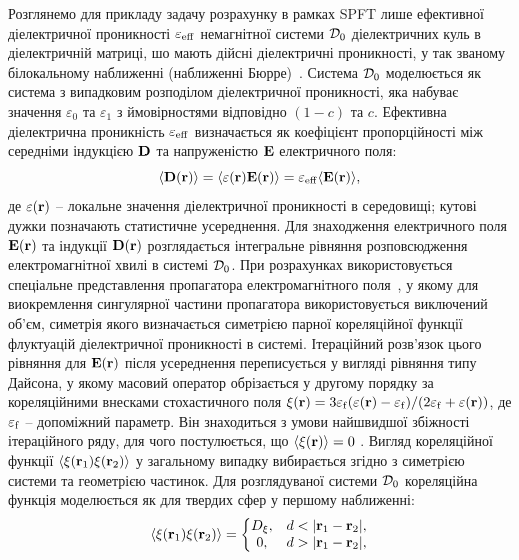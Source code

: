 \documentclass[14pt,twoside]{vakthesis}
\begin{document}
Розглянемо для прикладу задачу розрахунку в рамках SPFT лише  ефективної діелектричної проникності ${\varepsilon}_{\rm eff}$ немагнітної системи ${\cal D}_0$ діелектричних куль в діелектричній матриці, шо мають дійсні діелектричні проникності,  у так званому білокальному наближенні (наближенні Бюрре)~\cite{Tsang1981,RyzhovRev}.
Система ${\cal D}_0$  моделюється як система з випадковим розподілом діелектричної проникності, яка набуває значення ${\varepsilon}_0$ та ${\varepsilon}_1$ з ймовірностями відповідно $(1-c)$ та $c$.
Ефективна діелектрична проникність ${\varepsilon}_{\rm eff}$ визначається як коефіцієнт пропорційності між середніми індукцією ${\bf D}$ та напруженістю ${\bf E}$ електричного поля:
\begin{equation}\label{eq:eps-eff-def}
 \langle {\bf D} ({\bf r}) \rangle = \langle {\varepsilon} ({\bf r}) {\bf E} ({\bf r}) \rangle
 = {\varepsilon}_{\rm eff} \langle {\bf E} ({\bf r}) \rangle,
\end{equation}
де ${\varepsilon} ({\bf r})$ -- локальне значення діелектричної
проникності в середовищі; кутові дужки позначають статистичне 
усереднення.  Для знаходження електричного поля ${\bf E} ({\bf r}) $ та індукції $ {\bf D} ({\bf r}) $ розглядається інтегральне рівняння розповсюдження електромагнітної хвилі в системі ${\cal D}_0$. 
При розрахунках використовується спеціальне представлення пропагатора електромагнітного поля~\cite{Ryzhov1965, Weighofer1989, Weiglhofer1995, Sushko2004}, у якому для виокремлення сингулярної частини пропагатора використовується виключений об'єм, симетрія якого визначається симетрією парної кореляційної функції флуктуацій діелектричної проникності в системі.
Ітераційний розв'язок  цього рівняння для ${\bf E} ({\bf r})$  після усереднення переписується у вигляді рівняння типу Дайсона, у якому  масовий оператор обрізається у другому порядку за кореляційними внесками стохастичного поля 
$\xi({\bf r}) = 3\varepsilon_{\rm f} (\varepsilon({\bf r}) - \varepsilon_{\rm f})/(2\varepsilon_{\rm f} + \varepsilon({\bf r}))$, де $\varepsilon_{\rm f}$ -- допоміжний параметр. Він знаходиться з умови найшвидшої збіжності ітераційного ряду, для чого постулюється, що $\langle \xi({\bf r}) \rangle = 0$
\cite{Tsang1981, Ryzhov1965, RyzhovRev, Mackay2000}. 
Вигляд кореляційної функції $\langle \xi({\bf r}_1) \xi({\bf r}_2) \rangle$ у загальному випадку вибирається згідно з симетрією системи та геометрією частинок. 
Для розглядуваної системи ${\cal D}_0$ кореляційна функція моделюється як для  твердих сфер у першому наближенні:
$$
\langle \xi({\bf r}_1) \xi({\bf r}_2) \rangle  =  \left\{ 
\begin{matrix}
D_{\xi},& d < |{\bf r}_1 - {\bf r}_2|, \\
0,& d > |{\bf r}_1 - {\bf r}_2|,
\end{matrix}
\right.
$$
\end{document}
